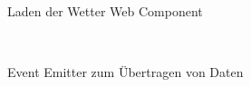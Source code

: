 \begin{figure}[hbt!]
	\centering
	\begin{minipage}[t]{0.7\textwidth}	
		\caption{Laden der Wetter Web Component}
		\\ %
		\label{fig:PrototypEinmaligesLadenWC}
	\end{minipage}
\end{figure}

\newpage
\begin{figure}[hbt!]
	\centering
	\begin{minipage}[t]{0.6\textwidth}	
		\caption{Event Emitter zum Übertragen von Daten}
		\\ %
		\label{fig:MFSharingDataEventEmitter}
	\end{minipage}
\end{figure}

